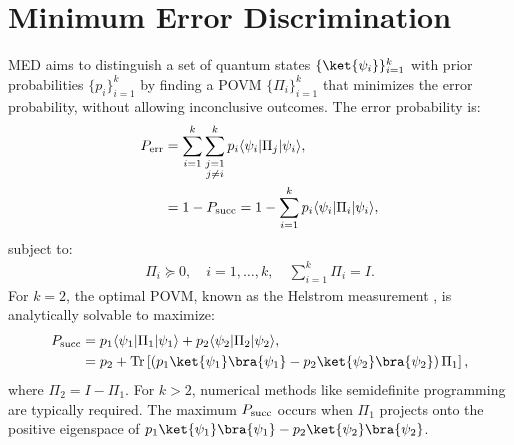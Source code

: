 \section{Minimum Error Discrimination}
\label{sec:med}
MED aims to distinguish a set of quantum states \(\{ \ket{\psi_i} \}_{i=1}^k\)
with prior probabilities \(\{ p_i \}_{i=1}^k\) by finding a POVM
\(\{ \Pi_i \}_{i=1}^k\) that minimizes the error probability, without allowing
inconclusive outcomes.
The error probability is:
\begin{align}
    P_{\mathrm{err}} & = \sum_{i=1}^k \sum_{\substack{j=1                                                                  \\ j \neq i}}^k p_i \langle \psi_i | \Pi_j | \psi_i \rangle, \label{eq:med_error} \\
          & = 1 - P_{\mathrm{succ}} = 1 - \sum_{i=1}^k p_i \langle \psi_i | \Pi_i | \psi_i \rangle, \label{eq:med_success}
\end{align}
subject to:
\begin{align}
    \Pi_i \succeq 0, \quad i = 1, \ldots, k, \quad \sum_{i=1}^k \Pi_i = I. \label{eq:med_povm_constraints}
\end{align}
For \(k = 2\), the optimal POVM, known as the Helstrom measurement \cite{Barnett:09},
is analytically solvable to maximize:
\begin{align}
    \psucc & = p_1 \langle \psi_1 | \Pi_1 | \psi_1 \rangle + p_2 \langle \psi_2 | \Pi_2 | \psi_2 \rangle, \notag                                             \\
           & = p_2 + \operatorname{Tr} \left[ \left( p_1 \ket{\psi_1}\bra{\psi_1} - p_2 \ket{\psi_2}\bra{\psi_2} \right) \Pi_1 \right], \label{eq:med_psucc}
\end{align}
where \(\Pi_2 = I - \Pi_1\).
For \(k > 2\), numerical methods like semidefinite programming are typically required.
The maximum \(P_{\mathrm{succ}}\) occurs when \(\Pi_1\) projects onto the positive
eigenspace of \(p_1 \ket{\psi_1}\bra{\psi_1} - p_2 \ket{\psi_2}\bra{\psi_2}\).

